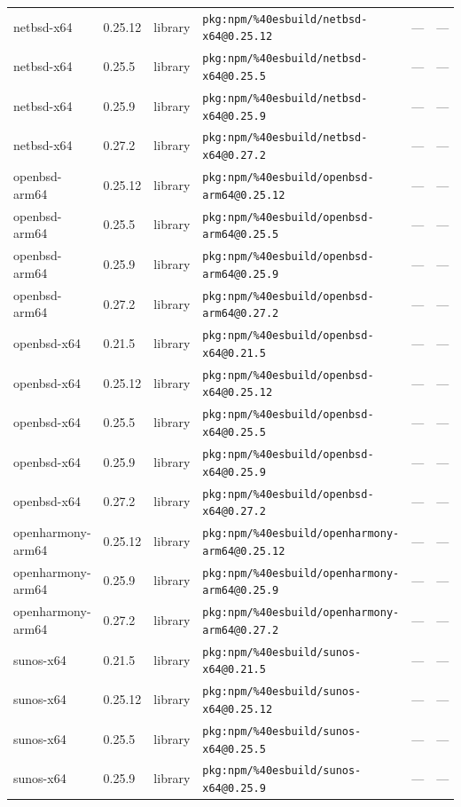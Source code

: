\documentclass[11pt]{article}
\begin{document}
\begin{longtable}{|l|l|l|p{2.2cm}|l|p{4cm}|}
netbsd-x64 & 0.25.12 & library & \texttt{pkg:npm/\%40esbuild/netbsd-x64@0.25.12} & — & — \\
netbsd-x64 & 0.25.5 & library & \texttt{pkg:npm/\%40esbuild/netbsd-x64@0.25.5} & — & — \\
netbsd-x64 & 0.25.9 & library & \texttt{pkg:npm/\%40esbuild/netbsd-x64@0.25.9} & — & — \\
netbsd-x64 & 0.27.2 & library & \texttt{pkg:npm/\%40esbuild/netbsd-x64@0.27.2} & — & — \\
openbsd-arm64 & 0.25.12 & library & \texttt{pkg:npm/\%40esbuild/openbsd-arm64@0.25.12} & — & — \\
openbsd-arm64 & 0.25.5 & library & \texttt{pkg:npm/\%40esbuild/openbsd-arm64@0.25.5} & — & — \\
openbsd-arm64 & 0.25.9 & library & \texttt{pkg:npm/\%40esbuild/openbsd-arm64@0.25.9} & — & — \\
openbsd-arm64 & 0.27.2 & library & \texttt{pkg:npm/\%40esbuild/openbsd-arm64@0.27.2} & — & — \\
openbsd-x64 & 0.21.5 & library & \texttt{pkg:npm/\%40esbuild/openbsd-x64@0.21.5} & — & — \\
openbsd-x64 & 0.25.12 & library & \texttt{pkg:npm/\%40esbuild/openbsd-x64@0.25.12} & — & — \\
openbsd-x64 & 0.25.5 & library & \texttt{pkg:npm/\%40esbuild/openbsd-x64@0.25.5} & — & — \\
openbsd-x64 & 0.25.9 & library & \texttt{pkg:npm/\%40esbuild/openbsd-x64@0.25.9} & — & — \\
openbsd-x64 & 0.27.2 & library & \texttt{pkg:npm/\%40esbuild/openbsd-x64@0.27.2} & — & — \\
openharmony-arm64 & 0.25.12 & library & \texttt{pkg:npm/\%40esbuild/openharmony-arm64@0.25.12} & — & — \\
openharmony-arm64 & 0.25.9 & library & \texttt{pkg:npm/\%40esbuild/openharmony-arm64@0.25.9} & — & — \\
openharmony-arm64 & 0.27.2 & library & \texttt{pkg:npm/\%40esbuild/openharmony-arm64@0.27.2} & — & — \\
sunos-x64 & 0.21.5 & library & \texttt{pkg:npm/\%40esbuild/sunos-x64@0.21.5} & — & — \\
sunos-x64 & 0.25.12 & library & \texttt{pkg:npm/\%40esbuild/sunos-x64@0.25.12} & — & — \\
sunos-x64 & 0.25.5 & library & \texttt{pkg:npm/\%40esbuild/sunos-x64@0.25.5} & — & — \\
sunos-x64 & 0.25.9 & library & \texttt{pkg:npm/\%40esbuild/sunos-x64@0.25.9} & — & — \\

\end{longtable}
\end{document}
